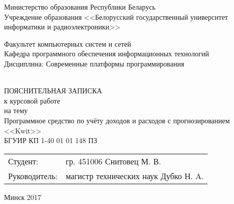 \begin{titlepage}
  \begin{center}
    Министерство образования Республики Беларусь\\[0.4em]
    Учреждение образования <<Белорусский государственный университет информатики
    и радиоэлектроники>>\\[3.5em]

    \begin{minipage}{\textwidth}
      \begin{center}
          Факультет компьютерных систем и сетей\\[1em]
          Кафедра программного обеспечения информационных технологий\\[1em]
          Дисциплина: Современные платформы программирования
      \end{center}
    \end{minipage}\\[3em]
    ПОЯСНИТЕЛЬНАЯ ЗАПИСКА\\
    к курсовой работе\\
    на тему\\[1em]
    Программное средство по учёту доходов и расходов с прогнозированием \\ <<Kwit>>\\[1em]
    БГУИР КП 1-40 01 01 148 ПЗ
    \vspace{8em}

    \begin{flushright}
        \begin{minipage}{10cm}
        	\begin{tabular}{p{3cm} p{6.1cm}} 
        	Студент: & гр. 451006 Снитовец М. В. \\[1.4em]
            Руководитель: & магистр технических наук Дубко Н. A.
            \end{tabular}
        \end{minipage}
    \end{flushright}

    \vfill
    {\normalsize Минск 2017}
  \end{center}
\end{titlepage}
